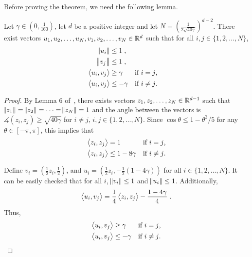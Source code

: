 Before proving the theorem, we need the following lemma.

\begin{lemma}
\label{lemma:embed_d_gamma}
Let $\gamma \in (0,\frac{1}{160})$, let $d$ be a positive integer and let $N = (\frac{1}{2\sqrt{40\gamma}})^{d-2}$.
There exist vectors $u_1, u_2, \dots, u_N, v_1, v_2, \dots, v_N \in \mathbb{R}^d$ such that for all $i, j \in \{1,2,\dots,N\}$,
\begin{align*}
\norm{u_i} & \le 1 \; , \\
\norm{v_j} & \le 1 \; , \\
\left\langle u_i, v_j \right\rangle & \ge \gamma & & \text{if $i=j$,} \\
\left\langle u_i, v_j \right\rangle & \le -\gamma & & \text{if $i \neq j$.}
\end{align*}
\end{lemma}

\begin{proof}
By Lemma 6 of~\citet{Long-1995}, there exists vectors $z_1, z_2, \dots, z_N \in
\mathbb{R}^{d-1}$ such that $\norm{z_1} = \norm{z_2} = \dots = \norm{z_N} = 1$ and the
angle between the vectors is $\measuredangle(z_i, z_j) \ge \sqrt{40 \gamma}$ for
$i \neq j$, $i,j \in \{1,2,\dots,N\}$. Since $\cos\theta \le 1-\theta^2/5$ for
any $\theta \in [-\pi,\pi]$, this implies that
\begin{align*}
\left\langle z_i, z_j \right\rangle &= 1 && \text{if $i = j$,} \\
\left\langle z_i, z_j \right\rangle &\le 1 - 8\gamma && \text{if $i \neq j$.}
\end{align*}

Define $v_i = (\frac{1}{2} z_i, \frac{1}{2})$, and $u_i = (\frac{1}{2} z_i,
-\frac{1}{2}(1-4\gamma))$ for all $i \in \{1,2,\dots,N\}$. It can be easily
checked that for all $i$, $\norm{v_i} \le 1$ and $\norm{u_i} \le 1$.
Additionally,
$$
\left\langle u_i, v_j \right\rangle = \frac{1}{4} \left\langle z_i, z_j \right\rangle - \frac {1-4\gamma} 4 \; .
$$
Thus,
\begin{align*}
\left\langle u_i, v_j \right\rangle &\ge \gamma && \text{if $i=j$,} \\
\left\langle u_i, v_j \right\rangle &\le -\gamma && \text{if $i \neq j$.}
\end{align*}
\end{proof}

